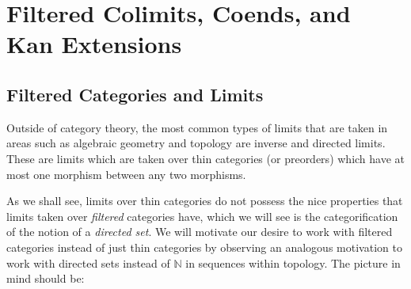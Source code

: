 \chapter{Filtered Colimits, Coends, and Kan Extensions}

\section{Filtered Categories and Limits}

Outside of category theory, the most common types of limits that are taken 
in areas such as algebraic geometry and topology are inverse and directed limits. 
These are limits which are taken over thin categories (or preorders) which have at 
most one morphism between any two morphisms. 

As we shall see, limits over thin categories do not possess the nice 
properties that limits taken over \emph{filtered} categories have, which we will 
see is the categorification 
of the notion of a \emph{directed set}. We will motivate our desire to 
work with filtered categories instead of just thin categories
by observing an analogous motivation to work with 
directed sets instead of $\mathbb{N}$ in sequences within topology. 
The picture in mind should be:

